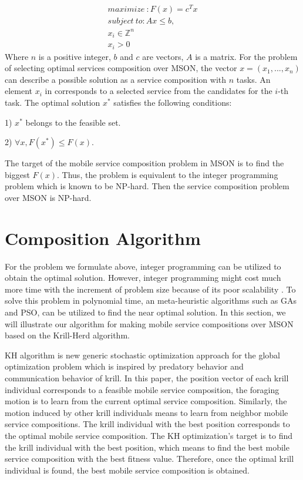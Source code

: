 \documentclass[10pt,journal,compsoc]{IEEEtran}
\begin{document}
\begin{eqnarray}
maximize \  : F(x) = c^{T}x     \\\nonumber
subject \ to: Ax \le b, \\\nonumber
x_i \in \mathbb{Z}^{n} \\\nonumber
x_i > 0 
\end{eqnarray}
Where $n$ is a positive integer, $b$ and $c$ are vectors, $A$ is a matrix.
For the problem of selecting optimal services composition over MSON, the vector $x = (x_1, . . . , x_n)$ can describe a possible solution as a service composition with $n$ tasks. An element $x_i$ in corresponds to a selected service from the candidates for the $i$-th task.
The optimal solution  $x^*$ satisfies the following conditions:

1) $x^*$ belongs to the feasible set.

​2) $\forall x, F(x^*) \le F(x)$. 

The target of the mobile service composition problem in MSON is to find the biggest $F(x)$. Thus, the problem is equivalent to the integer programming problem which is known to be NP-hard. Then the service composition problem over MSON is NP-hard.

\section{Composition Algorithm}
For the problem we formulate above, integer programming can be utilized to obtain the optimal solution. However, integer programming might cost much more time with the increment of problem size because of its poor scalability \cite{nemhauser1988integer}. To solve this problem in polynomial time, an meta-heuristic algorithms such as GAs and PSO, can be utilized to find the near optimal solution.
In this section, we will illustrate our algorithm for making mobile service compositions over MSON based on the Krill-Herd algorithm.

​KH algorithm \cite{gandomi2012krill} is new generic stochastic optimization approach for the global optimization problem which is inspired by predatory behavior and communication behavior of krill. 
In this paper, the position vector of each krill individual corresponds to a feasible mobile service composition, 
the foraging motion is to learn from the current optimal service composition. 
Similarly, the motion induced by other krill individuals means to learn from neighbor mobile service compositions.
The krill individual with the best position corresponds to the optimal mobile service composition. 
The KH optimization's target is to find the krill individual with the best position, which means to find the best mobile service composition with the best fitness value. 
Therefore, once the optimal krill individual is found, the best mobile service composition is obtained.
\end{document}
